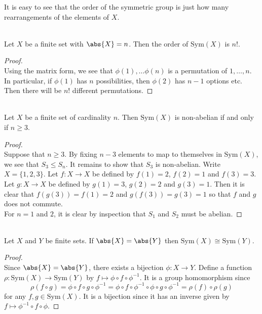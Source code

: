 \documentclass[a4paper]{article}
\begin{document}
It is easy to see that the order of the symmetric group is just how many rearrangements of the elements of $X$. 

\begin{lmm}{}{}\\
Let $X$ be a finite set with $\abs{X}=n$. Then the order of $\text{Sym}(X)$ is $n!$. 
\begin{proof}\\
Using the matrix form, we see that $\phi(1),\dots\phi(n)$ is a permutation of $1,\dots,n$. In particular, if $\phi(1)$ has $n$ possibilities, then $\phi(2)$ has $n-1$ options etc. Then there will be $n!$ different permutations. 
\end{proof}
\end{lmm}

\begin{prp}{}{}\\
Let $X$ be a finite set of cardinality $n$. Then $\text{Sym}(X)$ is non-abelian if and only if $n\geq 3$. 
\begin{proof}\\
Suppose that $n\geq 3$. By fixing $n-3$ elements to map to themselves in $\text{Sym}(X)$, we see that $S_3\leq S_n$. It remains to show that $S_3$ is non-abelian. Write $X=\{1,2,3\}$. Let $f:X\to X$ be defined by $f(1)=2$, $f(2)=1$ and $f(3)=3$. Let $g:X\to X$ be defined by $g(1)=3$, $g(2)=2$ and $g(3)=1$. Then it is clear that $f(g(3))=f(1)=2$ and $g(f(3))=g(3)=1$ so that $f$ and $g$ does not commute. \\

For $n=1$ and $2$, it is clear by inspection that $S_1$ and $S_2$ must be abelian. 
\end{proof}
\end{prp}

\begin{prp}{}{}\\
Let $X$ and $Y$ be finite sets. If $\abs{X}=\abs{Y}$ then $\text{Sym}(X)\cong\text{Sym}(Y)$. 
\begin{proof}\\
Since $\abs{X}=\abs{Y}$, there exists a bijection $\phi:X\to Y$. Define a function $\rho:\text{Sym}(X)\to\text{Sym}(Y)$ by $f\mapsto\phi\circ f\circ\phi^{-1}$. It is a group homomorphism since $$\rho(f\circ g)=\phi\circ f\circ g\circ\phi^{-1}=\phi\circ f\circ\phi^{-1}\circ\phi\circ g\circ\phi^{-1}=\rho(f)\circ\rho(g)$$ for any $f,g\in\text{Sym}(X)$. It is a bijection since it has an inverse given by $f\mapsto\phi^{-1}\circ f\circ\phi$. 
\end{proof}
\end{prp}
\end{document}
